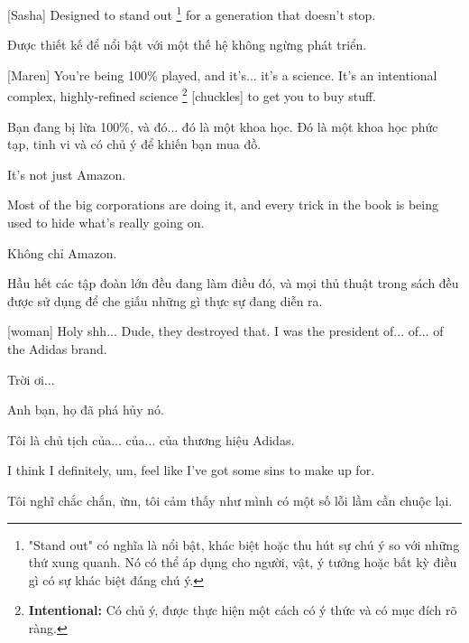 \documentclass[a4paper]{article}
\begin{document}
	[Sasha] Designed to stand out \footnote{
		"Stand out" có nghĩa là nổi bật, khác biệt hoặc thu hút sự chú ý so với những thứ xung quanh. Nó có thể áp dụng cho người, vật, ý tưởng hoặc bất kỳ điều gì có sự khác biệt đáng chú ý.
	} for a generation that doesn't stop.
	
	\begin{vietnamese-v2}
		[Sasha] Được thiết kế để nổi bật với một thế hệ không ngừng phát triển.
	\end{vietnamese-v2}

	
	[Maren] You're being 100\% played, and it's... it's a science. It's an intentional complex, highly-refined science \footnote{
		\textbf{Intentional:} Có chủ ý, được thực hiện một cách có ý thức và có mục đích rõ ràng.
	
	} [chuckles] to get you to buy stuff.
	
	\begin{vietnamese-v2}
		[Maren] Bạn đang bị lừa 100\%, và đó... đó là một khoa học. Đó là một khoa học phức tạp, tinh vi và có chủ ý để khiến bạn mua đồ.
	\end{vietnamese-v2}
	
	It's not just Amazon.
	
	Most of the big corporations are doing it, and every trick in the book is being used to hide what's really going on.
	
	\begin{vietnamese-v2}
		Không chỉ Amazon.
		
		Hầu hết các tập đoàn lớn đều đang làm điều đó, và mọi thủ thuật trong sách đều được sử dụng để che giấu những gì thực sự đang diễn ra.
	\end{vietnamese-v2}
	
	[woman] Holy shh...
	Dude, they destroyed that.
	I was the president of... of... of the Adidas brand.
	
	\begin{vietnamese-v2}
		 Trời ơi...
		
		Anh bạn, họ đã phá hủy nó.
		
		Tôi là chủ tịch của... của... của thương hiệu Adidas.
	\end{vietnamese-v2}
	
	
	I think I definitely, um, feel like I've got some sins to make up for.
	
	\begin{vietnamese-v2}
		Tôi nghĩ chắc chắn, ừm, tôi cảm thấy như mình có một số lỗi lầm cần chuộc lại.
	\end{vietnamese-v2}
	
\end{document}
